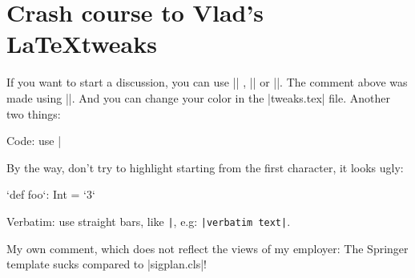 \section*{Crash course to Vlad's \LaTeX tweaks}

 If you want to start a discussion, you can use || , || or ||. The comment above was made using ||. And you can change your color in the |tweaks.tex| file. Another two things:



\noindent Code: use |

\noindent By the way, don't try to highlight starting from the first character, it looks ugly:

\begin{lstlisting-nobreak}
  `def foo`: Int = `3`
\end{lstlisting-nobreak}

\noindent Verbatim: use straight bars, like \verb=|=, e.g: \verb=|verbatim text|=.

My own comment, which does not reflect the views of my employer: The Springer template sucks compared to |sigplan.cls|!